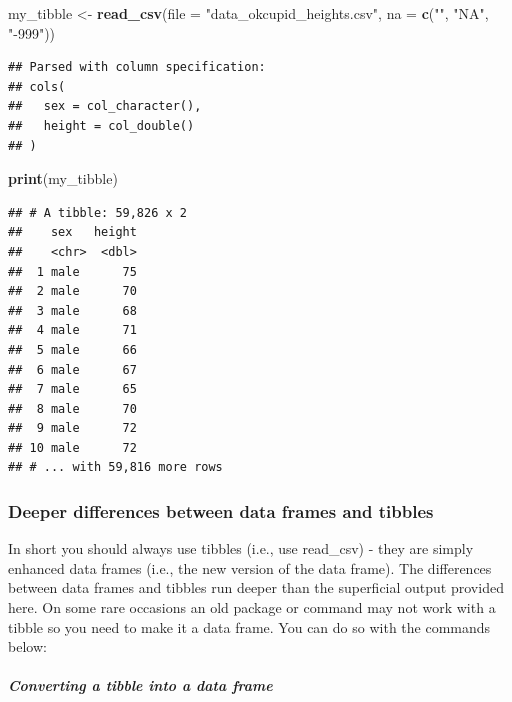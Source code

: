 \documentclass[
]{krantz}
\makeatletter
\newenvironment{Shaded}{\begin{snugshade}}{\end{snugshade}}
\newcommand{\DataTypeTok}[1]{\textcolor[rgb]{0.27,0.27,0.27}{#1}}
\newcommand{\KeywordTok}[1]{\textcolor[rgb]{0.27,0.27,0.27}{\textbf{#1}}}
\newcommand{\NormalTok}[1]{#1}
\newcommand{\StringTok}[1]{\textcolor[rgb]{0.5,0.5,0.5}{#1}}
\newenvironment{kframe}{%
\medskip{}
\setlength{\fboxsep}{.8em}
 \def\at@end@of@kframe{}%
 \ifinner\ifhmode%
  \def\at@end@of@kframe{\end{minipage}}%
  \begin{minipage}{\columnwidth}%
 \fi\fi%
 \def\FrameCommand##1{\hskip\@totalleftmargin \hskip-\fboxsep
 \colorbox{shadecolor}{##1}\hskip-\fboxsep
     \hskip-\linewidth \hskip-\@totalleftmargin \hskip\columnwidth}%
 \MakeFramed {\advance\hsize-\width
   \@totalleftmargin\z@ \linewidth\hsize
   \@setminipage}}%
 {\par\unskip\endMakeFramed%
 \at@end@of@kframe}
\renewenvironment{Shaded}{\begin{kframe}}{\end{kframe}}
\makeatother
\begin{document}
\begin{Shaded}
\begin{Highlighting}[]
\NormalTok{my_tibble <-}\StringTok{ }\KeywordTok{read_csv}\NormalTok{(}\DataTypeTok{file =} \StringTok{"data_okcupid_heights.csv"}\NormalTok{, }
                    \DataTypeTok{na =} \KeywordTok{c}\NormalTok{(}\StringTok{""}\NormalTok{, }\StringTok{"NA"}\NormalTok{, }\StringTok{"-999"}\NormalTok{))}
\end{Highlighting}
\end{Shaded}

\begin{verbatim}
## Parsed with column specification:
## cols(
##   sex = col_character(),
##   height = col_double()
## )
\end{verbatim}

\begin{Shaded}
\begin{Highlighting}[]
\KeywordTok{print}\NormalTok{(my_tibble)}
\end{Highlighting}
\end{Shaded}

\begin{verbatim}
## # A tibble: 59,826 x 2
##    sex   height
##    <chr>  <dbl>
##  1 male      75
##  2 male      70
##  3 male      68
##  4 male      71
##  5 male      66
##  6 male      67
##  7 male      65
##  8 male      70
##  9 male      72
## 10 male      72
## # ... with 59,816 more rows
\end{verbatim}

\hypertarget{deeper-differences-between-data-frames-and-tibbles}{%
\subsubsection{Deeper differences between data frames and tibbles}\label{deeper-differences-between-data-frames-and-tibbles}}

In short you should always use tibbles (i.e., use read\_csv) - they are simply enhanced data frames (i.e., the new version of the data frame). The differences between data frames and tibbles run deeper than the superficial output provided here. On some rare occasions an old package or command may not work with a tibble so you need to make it a data frame. You can do so with the commands below:

\hypertarget{converting-a-tibble-into-a-data-frame}{%
\subparagraph{Converting a tibble into a data frame}\label{converting-a-tibble-into-a-data-frame}}
\end{document}

